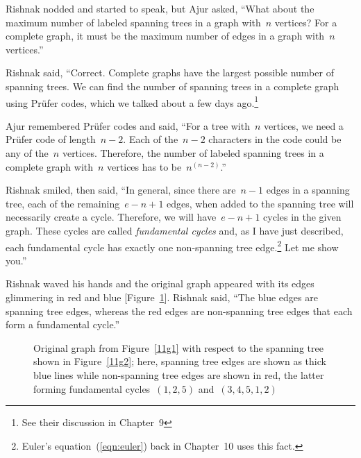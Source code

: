 Rishnak nodded and started to speak, but Ajur asked, ``What about the maximum number of labeled spanning trees in a graph with~$n$ vertices? For a complete graph, it must be the maximum number of edges in a graph with~$n$ vertices.''

Rishnak said, ``Correct. Complete graphs have the largest possible number of spanning trees. We can find the number of spanning trees in a complete graph using Pr{\"u}fer codes, which we talked about a few days ago.\footnote{See their discussion in Chapter~9}

Ajur remembered Pr\"ufer codes and said, ``For a tree with~$n$ vertices, we need a Pr{\"u}fer code of length~$n-2$. Each of the~$n-2$ characters in the code could be any of the~$n$ vertices. Therefore, the number of labeled spanning trees in a complete graph with~$n$ vertices has to be~$n^{(n-2)}$.''

Rishnak smiled, then said, ``In general, since there are~$n-1$ edges in a spanning tree, each of the remaining~$e-n+1$ edges, when added to the spanning tree will necessarily create a cycle. Therefore, we will have~$e-n+1$ cycles in the given graph. These cycles are called \textit{fundamental cycles} and, as I have just described, each fundamental cycle has exactly one non-spanning tree edge.\footnote{Euler's equation~(\ref{eqn:euler}) back in Chapter~10 uses this fact.} Let me show you.''

Rishnak waved his hands and the original graph appeared with its edges glimmering in red and blue [Figure~\ref{11g4}]. Rishnak said, ``The blue edges are spanning tree edges, whereas the red edges are non-spanning tree edges that each form a fundamental cycle.''
\begin{figure}
\begin{center}
\caption{Original graph from Figure~\ref{11g1} with respect to the spanning tree shown in Figure~\ref{11g2}; here, spanning tree edges are shown as thick blue lines while non-spanning tree edges are shown in red, the latter forming fundamental cycles~$(1,2,5)$ and~$(3,4,5,1,2)$}\label{11g4}
\end{center}
\end{figure}

